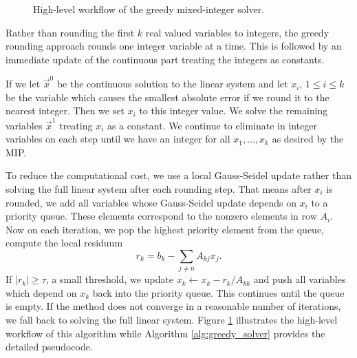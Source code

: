 \documentclass[12pt, letterpaper]{article}
\begin{document}
\begin{figure}
\caption{High-level workflow of the greedy mixed-integer solver.}
\label{fig:greedy_solver}
\end{figure}

Rather than rounding the first $k$ real valued variables to integers, the greedy rounding approach rounds one integer variable at a time. This is followed by an immediate update of the continuous part treating the integers as constants. 

If we let $\vec{x}^0$ be the continuous solution to the linear system and let $x_i$, $1 \leq i \leq k$ be the variable which causes the smallest absolute error if we round it to the nearest integer. Then we set $x_i$ to this integer value. We solve the remaining variables $\vec{x}^1$ treating $x_i$ as a constant. We continue to eliminate in integer variables on each step until we have an integer for all $x_1, \dots, x_k$ as desired by the MIP.

To reduce the computational cost, we use a local Gauss-Seidel update rather than solving the full linear system after each rounding step. That means after $x_i$ is rounded, we add all variables whose Gauss-Seidel update depends on $x_i$ to a priority queue. These elements correspond to the nonzero elements in row $A_i$. Now on each iteration, we pop the highest priority element from the queue, compute the local residuum 
\begin{equation}
    r_k = b_k - \sum_{j \neq n} A_{kj} x_j.
\end{equation}
If $|r_k| \geq \tau$, a small threshold, we update $x_k \leftarrow x_k - r_k / A_{kk}$ and push all variables which depend on $x_k$ back into the priority queue. This continues until the queue is empty. If the method does not converge in a reasonable number of iterations, we fall back to solving the full linear system. Figure \ref{fig:greedy_solver} illustrates the high-level workflow of this algorithm while Algorithm \ref{alg:greedy_solver} provides the detailed pseudocode. 
\end{document}
